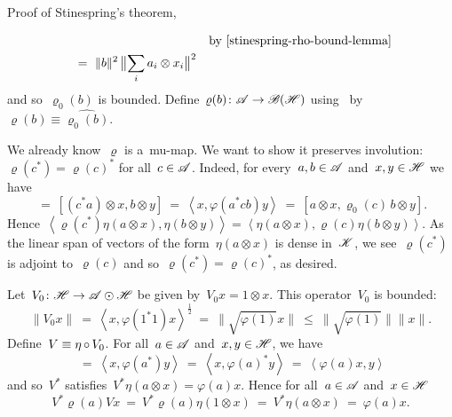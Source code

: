 \documentclass[b]{subfiles}
\begin{document}
\begin{parsec}
\begin{point}
\begin{point}{%
    Proof of Stinespring's theorem, }
\begin{point}
\begin{alignat*}{2}
    &\qquad& \text{by \eqref{stinespring-rho-bound-lemma}}\\
    &\ =\  \|b\|^2\, \bigl\| \sum_i a_i \otimes x_i \bigr\|^2
\end{alignat*}
and so~$\varrho_0(b)$ is bounded.
Define~$\varrho(b) \colon \mathscr{A} \to \mathscr{B}(\mathscr{H})$
    using~
    by~$\varrho(b) \equiv \widehat{\varrho_0(b)}$.
\end{point}
\begin{point}%
We already know~$\varrho$ is a~mu-map.
We want to show it preserves involution: $\varrho(c^*) = \varrho(c)^*$
for all~$c \in \mathscr{A}$.
Indeed, for every~$a,b \in \mathscr{A}$ and~$x,y \in \mathscr{H}$
    we have
    \begin{equation*}
        [\varrho_0(c^*) \, a\otimes x,b \otimes y]
        \ =\  [(c^* a)\otimes x,b \otimes y]
        \ =\  \left<x, \varphi(a^*cb) y \right>
        \ =\  [a\otimes x,\varrho_0(c)\, b \otimes y].
    \end{equation*}
Hence~$
    \left<\varrho(c^*) \eta(a\otimes x), \eta(b\otimes y)\right>=
    \left< \eta(a\otimes x), \varrho(c)\eta(b\otimes y)\right>$.
    As the linear span of vectors of the form~$\eta(a \otimes x)$
        is dense in~$\mathscr{K}$,
        we see~$\varrho(c^*)$ is adjoint to~$\varrho(c)$
        and so~$\varrho(c^*) = \varrho(c)^*$, as desired.
\end{point}
\begin{point}%
    Let~$V_0 \colon \mathscr{H} \to \mathscr{A} \odot \mathscr{H}$
        be given by~$V_0 x = 1 \otimes x$.
        This operator~$V_0$ is bounded:
\begin{equation*}
        \| V_0 x\|\  =\  \left<x, \varphi(1^*1) x\right>^{\frac{1}{2}}
        \ =\  \|\sqrt{\varphi(1)} x\| \ \leq \ \|\sqrt{\varphi(1)}\| \|x\|.
\end{equation*}
    Define~$V \equiv \eta \mathop{\circ} V_0$.
    For all~$a \in \mathscr{A}$ and~$x,y \in \mathscr{H}$, we have
\begin{equation*}
            [a \otimes x, V_0 y]
          \  =\ \left<x, \varphi(a^*)y\right>
          \  =\ \left<x, \varphi(a)^*y\right>
          \  =\ \left<\varphi(a) x, y\right>
\end{equation*}
    and so~$V^*$ satisfies~$V^* \eta(a \otimes x) = \varphi(a)x$.
    Hence for all~$a \in \mathscr{A}$ and~$x \in \mathscr{H}$
\begin{equation*}
    V^* \varrho(a) V x
        \ =\  V^* \varrho(a) \eta(1 \otimes x)
        \ =\  V^* \eta(a\otimes x)
        \ =\  \varphi(a)x.
\end{equation*}

\end{point}
\end{point}
\end{point}
\end{parsec}
\end{document}

